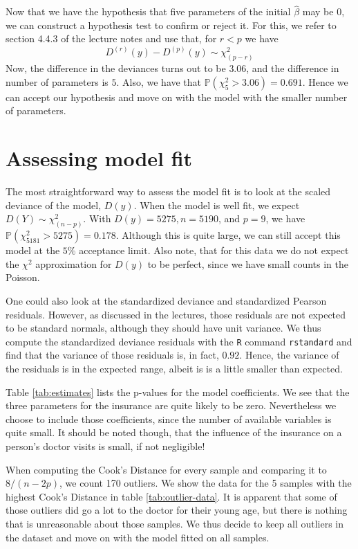 \documentclass[a4paper,11pt]{article}
\begin{document}
Now that we have the hypothesis that five parameters of the initial $\hat{\beta}$ may be $0$, we can construct a hypothesis test to confirm or reject it. For this, we refer to section 4.4.3 of the lecture notes and use that, for $r<p$ we have
\begin{equation}
D^{(r)}(y) - D^{(p)}(y) \sim \chi^2_{(p-r)}
\end{equation}
Now, the difference in the deviances turns out to be $3.06$, and the difference in number of parameters is $5$. Also, we have that $\mathbb{P}( \chi^2_{5} > 3.06) = 0.691$. Hence we can accept our hypothesis and move on with the model with the smaller number of parameters.

\section{Assessing model fit}
The most straightforward way to assess the model fit is to look at the scaled deviance of the model, $D(y)$. When the model is well fit, we expect $D(Y) \sim \chi^2_{(n-p)}$. With $D(y) = 5275, n = 5190$, and $p=9$, we have $\mathbb{P}( \chi^2_{5181} > 5275) = 0.178$. Although this is quite large, we can still accept this model at the $5\%$ acceptance limit. Also note, that for this data we do not expect the $\chi^2$ approximation for $D(y)$ to be perfect, since we have small counts in the Poisson.

One could also look at the standardized deviance and standardized Pearson residuals. However, as discussed in the lectures, those residuals are not expected to be standard normals, although they should have unit variance. We thus compute the standardized deviance residuals with the \texttt{R} command \texttt{rstandard} and find that the variance of those residuals is, in fact, $0.92$. Hence, the variance of the residuals is in the expected range, albeit is is a little smaller than expected.

Table \ref{tab:estimates} lists the p-values for the model coefficients. We see that the three parameters for the insurance are quite likely to be zero. Nevertheless we choose to include those coefficients, since the number of available variables is quite small. It should be noted though, that the influence of the insurance on a person's doctor visits is small, if not negligible!


When computing the Cook's Distance for every sample and comparing it to $8/(n-2p)$, we count 170 outliers. We show the data for the 5 samples with the highest Cook's Distance in table \ref{tab:outlier-data}. It is apparent that some of those outliers did go a lot to the doctor for their young age, but there is nothing that is unreasonable about those samples. We thus decide to keep all outliers in the dataset and move on with the model fitted on all samples.
\end{document}
